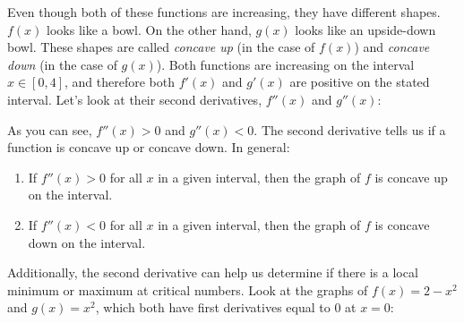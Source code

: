 Even though both of these functions are increasing, they have different shapes. 
$f(x)$ looks like a bowl. On the other hand, $g(x)$ looks like an upside-down 
bowl. These shapes are called \textit{concave up} (in the case of $f(x)$) and 
\textit{concave down} (in the case of $g(x)$). Both functions are increasing on 
the interval $x \in [0, 4]$, and therefore both $f'(x)$ and $g'(x)$ are 
positive on the stated interval. Let's look at their second derivatives, $f''(x
)$ and $g''(x)$:
\begin{figure}
\centering
{}
\end{figure}

As you can see, $f''(x) >0$ and $g''(x)<0$. The second derivative tells us if 
a function is concave up or concave down. In general:
\begin{enumerate}
\item If $f''(x)>0$ for all $x$ in a given interval, then the graph of $f$ is 
concave up on the interval.
\item If $f''(x)<0$ for all $x$ in a given interval, then the graph of $f$ is 
concave down on the interval.
\end{enumerate}

Additionally, the second derivative can help us determine if there is a local 
minimum or maximum at critical numbers. Look at the graphs of $f(x) = 2-x^2$ 
and $g(x) = x^2$, which both have first derivatives equal to $0$ at $x=0$:
\begin{figure}
\centering
{}
\end{figure}


